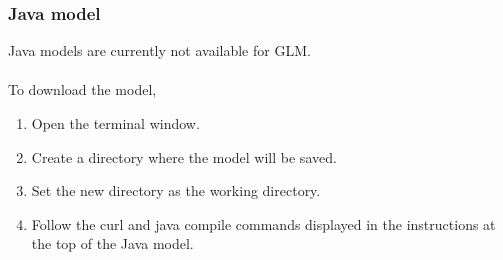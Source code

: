 \documentclass[11pt]{article}
\begin{document}
\subsubsection{Java model} 
Java models are currently not available for GLM.
\\
\\

To download the model, 
\begin{enumerate}
\item Open the terminal window. 
\item Create a directory where the model will be saved.
\item Set the new directory as the working directory.
\item Follow the curl and java compile commands displayed in the instructions at the top of the Java model.
\end{enumerate}
\end{document}

